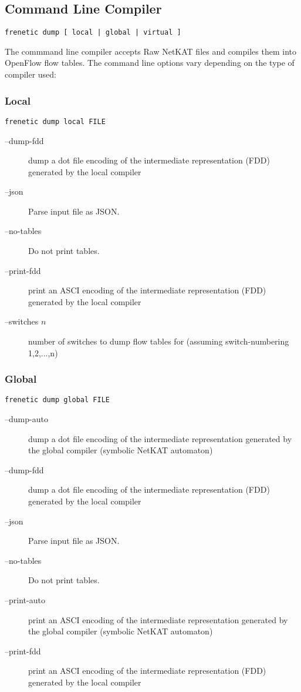 \subsection{Command Line Compiler}

\begin{verbatim}
frenetic dump [ local | global | virtual ]
\end{verbatim}

The commmand line compiler accepts Raw NetKAT files and compiles them into OpenFlow flow tables.
The command line options vary depending on the type of compiler used:

\subsubsection{Local}

\begin{verbatim}
frenetic dump local FILE
\end{verbatim}

\begin{description}
\item[--dump-fdd]    dump a dot file encoding of the intermediate representation
                  (FDD) generated by the local compiler
\item[--json]        Parse input file as JSON.
\item[--no-tables]   Do not print tables.
\item[--print-fdd]   print an ASCI encoding of the intermediate representation
                  (FDD) generated by the local compiler
\item[--switches $n$]  number of switches to dump flow tables for (assuming
                  switch-numbering 1,2,...,n)
\end{description}

\subsubsection{Global}

\begin{verbatim}
frenetic dump global FILE
\end{verbatim}

\begin{description}
\item[--dump-auto]   dump a dot file encoding of the intermediate representation
                  generated by the global compiler (symbolic NetKAT automaton)
\item[--dump-fdd]    dump a dot file encoding of the intermediate representation
                  (FDD) generated by the local compiler
\item[--json]        Parse input file as JSON.
\item[--no-tables]   Do not print tables.
\item[--print-auto]  print an ASCI encoding of the intermediate representation
                  generated by the global compiler (symbolic NetKAT automaton)
\item[--print-fdd]   print an ASCI encoding of the intermediate representation
                  (FDD) generated by the local compiler
\end{description}

